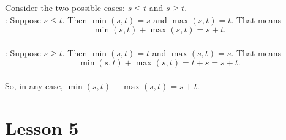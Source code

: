 \documentclass[11pt]{amsart}
\begin{document}
\begin{enumerate}
{\color{blue} Consider the two possible cases: $s\leq t$ and $s\geq t$.\\
: Suppose $s\leq t$. Then $\min(s,t) = s$ and $\max(s,t)=t$. That means
\[\min(s,t)+\max(s,t) = s+t.\]\\[3pt]
: Suppose $s\geq t$. Then $\min(s,t) = t$ and $\max(s,t)=s$. That means
\[\min(s,t)+\max(s,t) = t+s = s+t.\]\\[3pt]
So, in any case, $\min(s,t)+\max(s,t) = s+t$.\\[5pt]
}
\end{enumerate}

\section{Lesson 5}
\end{document}
